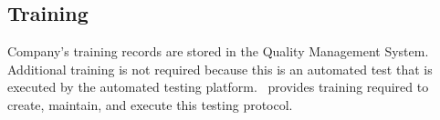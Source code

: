 \subsection{Training}
Company's training records are stored in the Quality Management System.
Additional training is not required because this is an automated test that is
executed by the automated testing platform.  \sopSDLC\ provides training
required to create, maintain, and execute this testing protocol.
